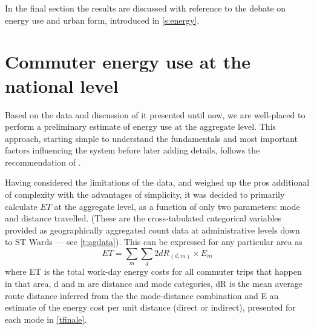 In the final section the results are discussed with
reference to the debate on energy use and urban form, introduced in
\cref{s:energy}. %

\section{Commuter energy use at the national level} \label{snational}
Based on the data and discussion of it presented until now, we are
well-placed to perform a preliminary estimate of energy use at the aggregate level.
This approach, starting simple to understand the fundamentals and most important
factors influencing the system before later adding details, follows the
recommendation of \citet{batty1976urban}.

Having considered the limitations of the data, and weighed up the
pros additional of complexity with the advantages of simplicity, it was decided to
primarily calculate $ET$ at the aggregate level,
as a function of only two parameters: mode and distance travelled.
(These are the cross-tabulated categorical variables provided as geographically
aggregated count data at administrative levels down to ST Wards ---
see \cref{t:agdata}). This can be expressed for any particular area as
\begin{equation}
 ET = \sum_m \sum_d{2dR_{(d,m)} \times E_m}
 \label{eqet1}
\end{equation}
where ET is the total work-day energy costs for all commuter trips that happen
in that area, d and m are distance and mode categories, dR is the mean average
route distance inferred from the the mode-distance combination and E an
estimate of the
energy cost per unit distance (direct or indirect), presented for each mode
in \cref{tfinale}.

